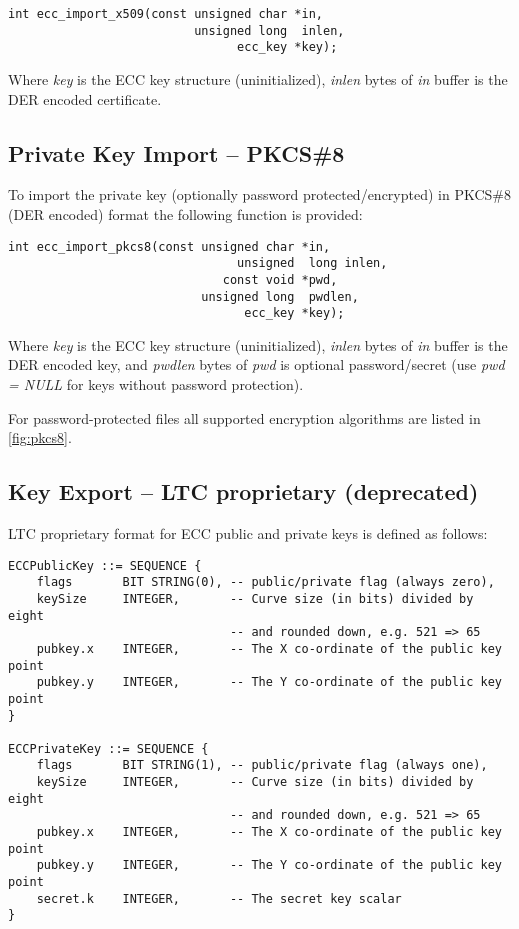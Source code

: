 \documentclass[synpaper]{book}
\begin{document}
\begin{verbatim}
int ecc_import_x509(const unsigned char *in,
                          unsigned long  inlen,
                                ecc_key *key);
\end{verbatim}

Where \textit{key} is the ECC key structure (uninitialized), \textit{inlen} bytes of \textit{in} buffer is the DER encoded certificate.

\subsection{Private Key Import -- PKCS\#8}
To import the private key (optionally password protected/encrypted) in PKCS\#8 (DER encoded) format the following function is provided:

\begin{verbatim}
int ecc_import_pkcs8(const unsigned char *in,
                                unsigned  long inlen,
                              const void *pwd,
                           unsigned long  pwdlen,
                                 ecc_key *key);
\end{verbatim}

Where \textit{key} is the ECC key structure (uninitialized), \textit{inlen} bytes of \textit{in} buffer is the DER encoded key,
and \textit{pwdlen} bytes of \textit{pwd} is optional password/secret (use \textit{pwd = NULL} for keys without password protection).

For password-protected files all supported encryption algorithms are listed in \ref{fig:pkcs8}.

\subsection{Key Export -- LTC proprietary (deprecated)}

LTC proprietary format for ECC public and private keys is defined as follows:

\begin{small}
\begin{verbatim}
ECCPublicKey ::= SEQUENCE {
    flags       BIT STRING(0), -- public/private flag (always zero),
    keySize     INTEGER,       -- Curve size (in bits) divided by eight
                               -- and rounded down, e.g. 521 => 65
    pubkey.x    INTEGER,       -- The X co-ordinate of the public key point
    pubkey.y    INTEGER,       -- The Y co-ordinate of the public key point
}

ECCPrivateKey ::= SEQUENCE {
    flags       BIT STRING(1), -- public/private flag (always one),
    keySize     INTEGER,       -- Curve size (in bits) divided by eight
                               -- and rounded down, e.g. 521 => 65
    pubkey.x    INTEGER,       -- The X co-ordinate of the public key point
    pubkey.y    INTEGER,       -- The Y co-ordinate of the public key point
    secret.k    INTEGER,       -- The secret key scalar
}
\end{verbatim}
\end{small}
\end{document}

